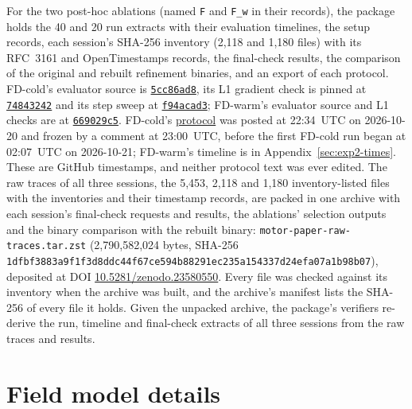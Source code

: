 \documentclass{anvil-paper}
\begin{document}
For the two post-hoc ablations (named \texttt{F} and \texttt{F\_w} in their records), the package holds the 40 and 20 run
extracts with their evaluation timelines, the setup records, each session's SHA-256 inventory (2,118 and
1,180 files) with its RFC~3161 and OpenTimestamps records, the final-check
results, the comparison of the original and rebuilt refinement binaries,
and an export of each protocol. FD-cold's evaluator source is
\href{https://github.com/rjwalters/geode-fem/tree/5cc86ad81aeea4847a2608fcafde22a1bbfb6990/benchmarks/motor_optimization}{\texttt{5cc86ad8}},
its L1 gradient check is pinned at
\href{https://github.com/rjwalters/geode-fem/tree/74843242db03e8d57edf971420171064bf19f107/benchmarks/motor_optimization/harness}{\texttt{74843242}}
and its step sweep at
\href{https://github.com/rjwalters/geode-fem/tree/f94acad3f312c7d417830ff82b66a78a1ea89fb2/benchmarks/motor_optimization/harness}{\texttt{f94acad3}};
FD-warm's evaluator source and L1 checks are at
\href{https://github.com/rjwalters/geode-fem/tree/669029c5653cb5fe4724ec0c7525ba60c770975e/benchmarks/motor_optimization}{\texttt{669029c5}}.
FD-cold's \href{https://github.com/rjwalters/geode-fem/issues/1218}{protocol}
was posted at 22:34~UTC on 2026-10-20 and frozen by a comment at
23:00~UTC, before the first FD-cold run began at 02:07~UTC on 2026-10-21;
FD-warm's timeline is in Appendix~\ref{sec:exp2-times}. These are GitHub
timestamps, and neither protocol text was ever edited. The raw traces of all
three sessions, the 5,453, 2,118 and 1,180 inventory-listed files with the
inventories and their timestamp records, are packed in one archive with
each session's final-check requests and results, the ablations' selection
outputs and the binary comparison with the rebuilt binary:
\texttt{motor-paper-raw-traces.tar.zst} (2,790,582,024 bytes, SHA-256
\texttt{1dfbf3883a9f1f3d8ddc44f67ce594b8}\allowbreak\texttt{8291ec235a154337d24efa07a1b98b07}), deposited at
DOI \href{https://doi.org/10.5281/zenodo.23580550}{10.5281/zenodo.23580550}. Every file was checked against its inventory
when the archive was built, and the archive's manifest lists the SHA-256
of every file it holds. Given the unpacked archive, the package's verifiers
re-derive the run, timeline and final-check extracts of all three sessions
from the raw traces and results.

\appendix
\section{Field model details}\label{sec:fieldmodel}
\end{document}
